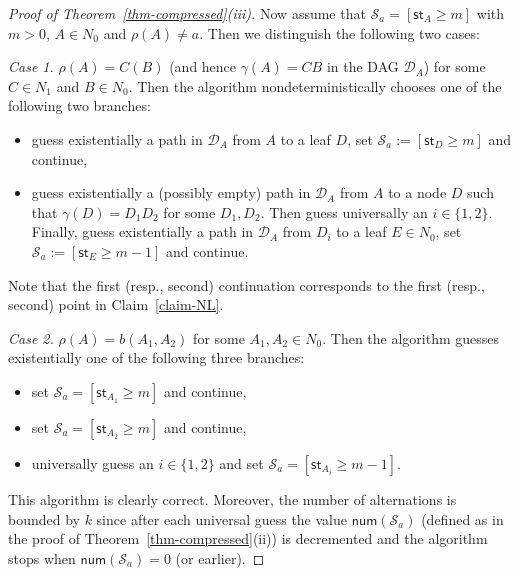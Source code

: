 \documentclass[a4paper,UKenglish,cleveref, autoref, thm-restate, numberwithinsect]{lipics-v2021}
\newcommand{\num}{\mathsf{num}}
\newcommand{\hs}{\mathsf{st}}
\begin{document}
\begin{proof}[Proof of Theorem~\ref{thm-compressed}(iii)]
Now assume that $\mathcal{S}_a = [\hs_A \geq m]$ with $m > 0$, $A \in N_0$ and $\rho(A) \neq a$. Then we distinguish the following two cases:

\medskip
\noindent
\emph{Case 1.} $\rho(A) = C(B)$ (and hence $\gamma(A) = CB$ in the DAG $\mathcal{D}_A$)
 for some $C \in N_1$ and $B \in N_0$. Then the algorithm nondeterministically chooses one of the following two branches:
\begin{itemize} 
\item guess existentially a path in $\mathcal{D}_A$ from $A$ to a leaf $D$, set $\mathcal{S}_a := [\hs_D \geq m]$ and continue, 
\item guess existentially a (possibly empty) path in $\mathcal{D}_A$ from $A$ to a node $D$ such that $\gamma(D) = D_1 D_2$ for some 
$D_1, D_2$. Then guess universally an $i \in \{1,2\}$. Finally, guess existentially a path in $\mathcal{D}_A$ from $D_i$ to a leaf $E \in N_0$,
set $\mathcal{S}_a := [\hs_E \geq m-1]$ and continue.
\end{itemize}
Note that the first (resp., second) continuation corresponds to the first (resp., second) point in Claim~\ref{claim-NL}.
 
\medskip
\noindent
\emph{Case 2.} $\rho(A) = b(A_1, A_2)$  for some $A_1 , A_2 \in N_0$.
Then the algorithm guesses existentially one of the following three branches:
\begin{itemize} 
\item set $\mathcal{S}_a = [\hs_{A_1} \geq m]$ and continue,
\item set $\mathcal{S}_a = [\hs_{A_2} \geq m]$ and continue,
\item universally guess an $i \in \{1,2\}$ and set $\mathcal{S}_a = [\hs_{A_i} \geq m-1]$.
\end{itemize}
This algorithm is clearly correct. Moreover, the number of alternations is bounded by $k$ since after each universal 
guess the value $\num(\mathcal{S}_a)$ (defined as in the proof of Theorem~\ref{thm-compressed}(ii)) is decremented and the algorithm stops when $\num(\mathcal{S}_a)=0$ (or earlier).



\end{proof}
\end{document}
